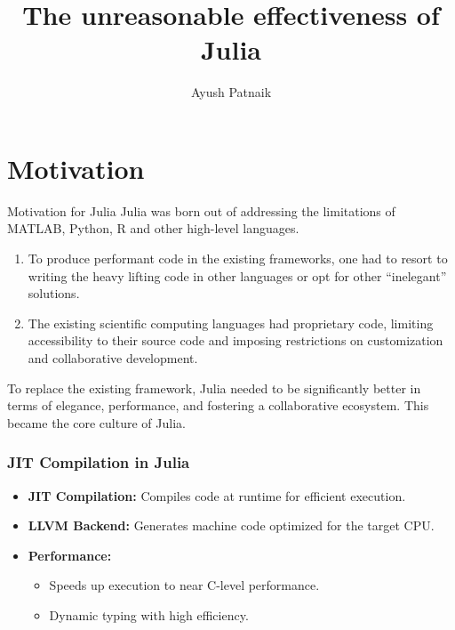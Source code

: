 \documentclass[aspectratio=169]{beamer} %
\title{The unreasonable effectiveness of Julia}
\author{Ayush Patnaik}
\begin{document}
\begin{frame}
  \titlepage
\end{frame}

\section{Motivation}

\begin{frame}{Motivation for Julia}
  Julia was born out of addressing the limitations of MATLAB, Python, R and other high-level languages. 
  \begin{enumerate}
    \item To produce performant code in the existing frameworks, one had to resort to writing the heavy lifting code in other languages or opt for other ``inelegant'' solutions. 
    \item The existing scientific computing languages had proprietary code, limiting accessibility to their source code and imposing restrictions on customization and collaborative development.
  \end{enumerate}
  To replace the existing framework, Julia needed to be significantly better in terms of elegance, performance, and fostering a collaborative ecosystem. This became the core culture of Julia.  
\end{frame}

\begin{frame}
  \frametitle{JIT Compilation in Julia}

  \begin{itemize}
    \item \textbf{JIT Compilation:} Compiles code at runtime for efficient execution.
    \item \textbf{LLVM Backend:} Generates machine code optimized for the target CPU.
    \item \textbf{Performance:} 
      \begin{itemize}
        \item Speeds up execution to near C-level performance.
        \item Dynamic typing with high efficiency.
      \end{itemize}
  \end{itemize}
  
\end{frame}
\end{document}
